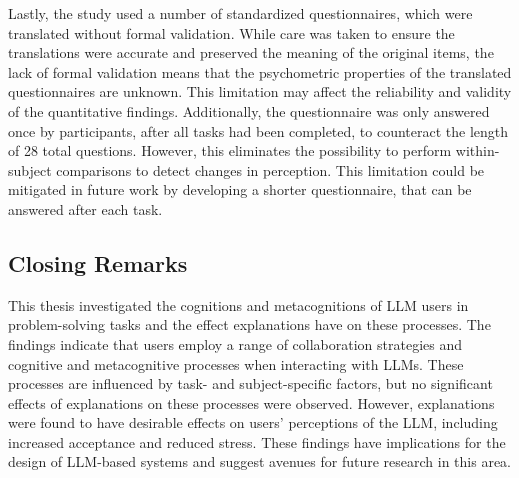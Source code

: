 Lastly, the study used a number of standardized questionnaires, which were translated without formal validation. While care was taken to ensure the translations were accurate and preserved the meaning of the original items, the lack of formal validation means that the psychometric properties of the translated questionnaires are unknown. This limitation may affect the reliability and validity of the quantitative findings. Additionally, the questionnaire was only answered once by participants, after all tasks had been completed, to counteract the length of 28 total questions. However, this eliminates the possibility to perform within-subject comparisons to detect changes in perception. This limitation could be mitigated in future work by developing a shorter questionnaire, that can be answered after each task.

\subsection{Closing Remarks} \label{ssec:closing-remarks}

This thesis investigated the cognitions and metacognitions of \ac{LLM} users in problem-solving tasks and the effect explanations have on these processes. The findings indicate that users employ a range of collaboration strategies and cognitive and metacognitive processes when interacting with \acp{LLM}. These processes are influenced by task- and subject-specific factors, but no significant effects of explanations on these processes were observed. However, explanations were found to have desirable effects on users' perceptions of the \ac{LLM}, including increased acceptance and reduced stress. These findings have implications for the design of \ac{LLM}-based systems and suggest avenues for future research in this area.
